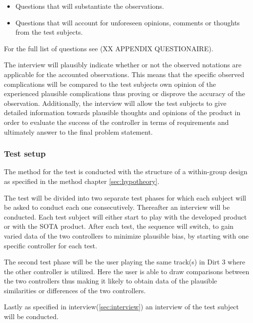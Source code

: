 \begin{itemize}
	\item Questions that will substantiate the observations.
	\item Questions that will account for unforeseen opinions, comments or thoughts from the test subjects.
\end{itemize}

 For the full list of questions see (XX APPENDIX QUESTIONAIRE).
 
 
The interview will plausibly indicate whether or not the observed notations are applicable for the accounted observations.
This means that the specific observed complications will be compared to the test subjects own opinion of the experienced plausible complications thus proving or disprove the accuracy of the observation. 
Additionally, the interview will allow the test subjects to give detailed information towards plausible thoughts and opinions of the product in order to evaluate the success of the controller in terms of requirements and ultimately answer to the final problem statement.


\subsubsection{Test setup}
The method for the test is conducted with the structure of a within-group design as specified in the method chapter \ref{sec:hypotheory}.
\bigskip

The test will be divided into two separate test phases for which each subject will be asked to conduct each one consecutively. 
Thereafter an interview will be conducted. 
Each test subject will either start to play with the developed product or with the SOTA product. 
After each test, the sequence will switch, to gain varied data of the two controllers to minimize plausible bias, by starting with one specific controller for each test.
\bigskip

The second test phase will be the user playing the same track(s) in Dirt 3 where the other controller is utilized. 
Here the user is able to draw comparisons between the two controllers thus making it likely to obtain data of the plausible similarities or differences of the two controllers.
\bigskip

Lastly as specified in interview(\ref{sec:interview}) an interview of the test subject will be conducted. 
